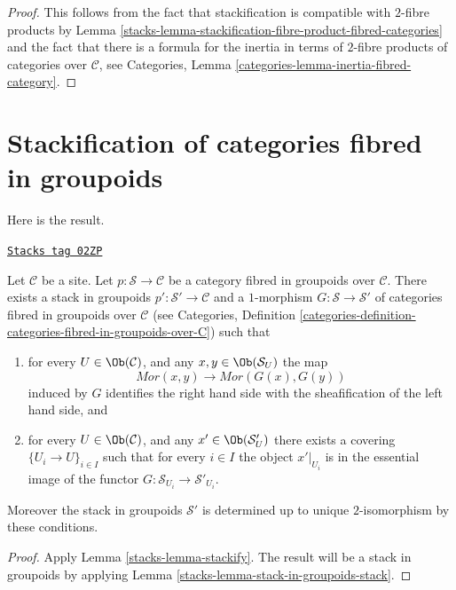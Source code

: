 \begin{proof}

This follows from the fact that stackification is compatible
with $2$-fibre products by
Lemma \ref{stacks-lemma-stackification-fibre-product-fibred-categories}
and the fact that there is a formula for the inertia in terms of
$2$-fibre products of categories over $\mathcal{C}$, see
Categories, Lemma \ref{categories-lemma-inertia-fibred-category}.
\end{proof}

\section{Stackification of categories fibred in groupoids}
\label{stacks-section-stackify-groupoids}
Here is the result.

\begin{lemma}
\label{stacks-lemma-stackify-groupoids}
\href{https://stacks.math.columbia.edu/tag/02ZP}{\texttt{Stacks tag 02ZP}}

Let $\mathcal{C}$ be a site.
Let $p : \mathcal{S} \to \mathcal{C}$ be a category
fibred in groupoids over $\mathcal{C}$.
There exists a stack in groupoids
$p' : \mathcal{S}' \to \mathcal{C}$ and a
$1$-morphism $G : \mathcal{S} \to \mathcal{S}'$
of categories fibred in groupoids over $\mathcal{C}$ (see
Categories, Definition
\ref{categories-definition-categories-fibred-in-groupoids-over-C})
such that
\begin{enumerate}
\item for every $U \in \Ob(\mathcal{C})$, and any
$x, y \in \Ob(\mathcal{S}_U)$ the map
$$
\mathit{Mor}(x, y) \longrightarrow \mathit{Mor}(G(x), G(y))
$$
induced by $G$ identifies the right hand side with the sheafification
of the left hand side, and
\item for every $U \in \Ob(\mathcal{C})$, and any
$x' \in \Ob(\mathcal{S}'_U)$ there exists a covering
$\{U_i \to U\}_{i \in I}$ such that for every $i \in I$ the
object $x'|_{U_i}$ is in the essential image of the
functor $G : \mathcal{S}_{U_i} \to \mathcal{S}'_{U_i}$.
\end{enumerate}
Moreover the stack in groupoids $\mathcal{S}'$ is determined up to unique
$2$-isomorphism by these conditions.
\end{lemma}

\begin{proof}

Apply Lemma \ref{stacks-lemma-stackify}. The result will be a
stack in groupoids by applying Lemma \ref{stacks-lemma-stack-in-groupoids-stack}.
\end{proof}

